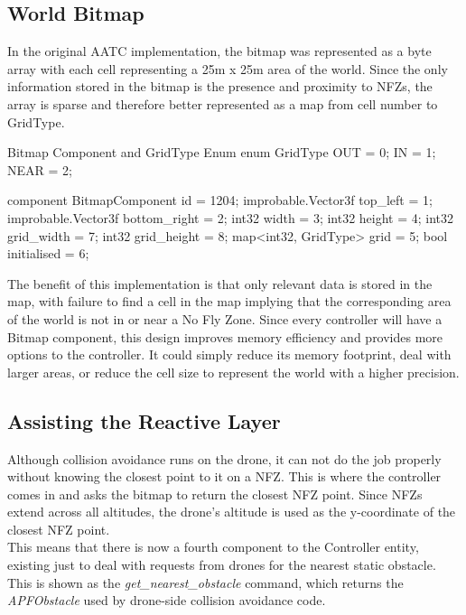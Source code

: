 \documentclass[a4paper,11pt,titlepage]{report}
\begin{document}
\clearpage
\subsection{World Bitmap}
In the original AATC implementation, the bitmap was represented as a byte array with each cell representing a 25m x 25m area of the world. Since the only information stored in the bitmap is the presence and proximity to NFZs, the array is sparse and therefore better represented as a map from cell number to GridType.\\

\begin{sexylisting}[colback=white]{Bitmap Component and GridType Enum}
enum GridType {
  OUT = 0;
  IN = 1;
  NEAR = 2;
}

component BitmapComponent {
  id = 1204;
  improbable.Vector3f top_left = 1;
  improbable.Vector3f bottom_right = 2;
  int32 width = 3;
  int32 height = 4;
  int32 grid_width = 7;
  int32 grid_height = 8;
  map<int32, GridType> grid = 5;
  bool initialised = 6;
}
\end{sexylisting}

\clearpage
The benefit of this implementation is that only relevant data is stored in the map, with failure to find a cell in the map implying that the corresponding area of the world is not in or near a No Fly Zone. Since every controller will have a Bitmap component, this design improves memory efficiency and provides more options to the controller. It could simply reduce its memory footprint, deal with larger areas, or reduce the cell size to represent the world with a higher precision.

\subsection{Assisting the Reactive Layer}
Although collision avoidance runs on the drone, it can not do the job properly without knowing the closest point to it on a NFZ. This is where the controller comes in and asks the bitmap to return the closest NFZ point. Since NFZs extend across all altitudes, the drone's altitude is used as the y-coordinate of the closest NFZ point.\\

This means that there is now a fourth component to the Controller entity, existing just to deal with requests from drones for the nearest static obstacle. This is shown as the \textit{get\_nearest\_obstacle} command, which returns the \textit{APFObstacle} used by drone-side collision avoidance code.\\
\end{document}

